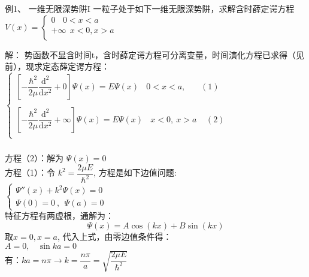 \begin{frame}
	\frametitle{}
	\begin{exampleblock} {例1、	一维无限深势阱I}
	一粒子处于如下一维无限深势阱，求解含时薛定谔方程\\
 	{ $ \displaystyle 
	V(x)=\left \{ 
	\begin{array}{cccc}
		0	~~ ~~ 0<x<a \\  
		+\infty ~~x<0, x>a\\
	\end{array}
	\right.
	$} \\
	\end{exampleblock} %
	\alert{解：} 	势函数不显含时间t，含时薛定谔方程可分离变量，时间演化方程已求得（见前），现求定态薛定谔方程：\\
	{  $ \displaystyle 
	\left \{ 
	\begin{array}{cccc}
		\left [ -\dfrac{\hbar^2}{2\mu} \dfrac{\mathrm{d} ^2}{\mathrm{d} x^2} +0 \right ]\Psi(x)=E\Psi(x)  ~~ ~~ 0<x<a,~~~~~~~~ (1)  \\ 
		\\	
		\left [ -\dfrac{\hbar^2}{2\mu} \dfrac{\mathrm{d} ^2}{\mathrm{d} x^2} +\infty \right ]\Psi(x)=E\Psi(x)  ~~ ~~ x<0,~ x>a ~~~~~(2)  \\
	\end{array}
	\right.
	$} \\
\end{frame}

\begin{frame}
	\frametitle{}
	方程（2）：解为  $\Psi(x) = 0$ \\ 
    方程（1）：令 $ k^2= \dfrac{2\mu E}{\hbar ^2} $, 方程是如下边值问题:  \\ 
	{ $ \displaystyle 
		\begin{cases}
			\Psi''(x) + k^2	\Psi(x)=0  \\
			\Psi(0)=0~,~~ \Psi(a)=0 ~~~~~
		\end{cases}
		$} \\  \vspace{0.3cm}
    特征方程有两虚根，通解为：\\
     	\begin{equation*}
  			\Psi(x) = A\cos(kx) +B\sin(kx) 
    	\end{equation*}
    取$x=0, x=a$,  代入上式，由零边值条件得：\\
   	\hspace{2cm} $A=0, ~~~~ \sin ka =0$  \\  \vspace{0.3cm}
	有：$ka=n\pi  \to  k=\dfrac{n\pi}{a} = \sqrt{\dfrac{2\mu E}{\hbar ^2}}$    \\ 
\end{frame}

